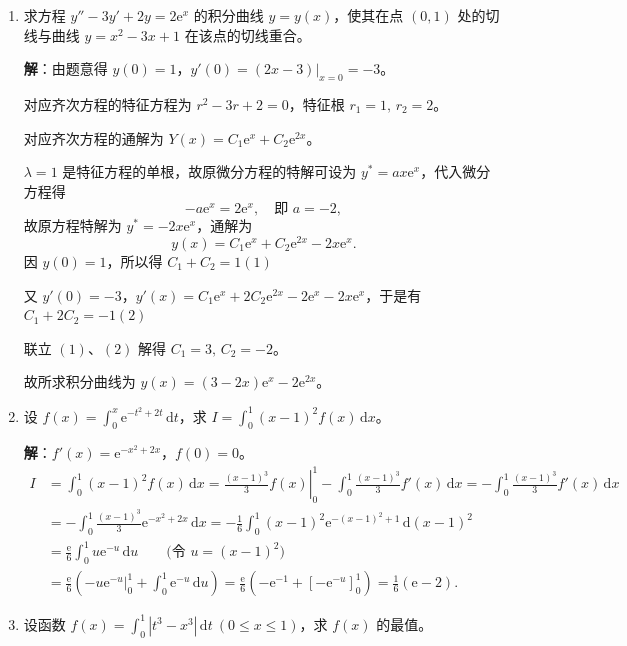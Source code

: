 \documentclass[a4paper,11pt]{ctexart}
\newcommand{\dd}{\,\mathrm{d}}
\newcommand{\e}{\mathrm{e}}
\begin{document}
\begin{enumerate}[label=\arabic*., start=11, leftmargin=2em, itemsep=0.9em, topsep=0.45em]
  \textbf{解}：将 $x=0$ 代入方程得 $\dfrac{1}{\sqrt{3}}\displaystyle\int_1^y\sqrt{4-t^2}\dd t=0$，因此得 $y=1$。

  方程两边关于 $x$ 求导得
  \[
    \e^{xy}(y+xy')+\frac{1}{\sqrt{3}}y'\sqrt{4-y^2}=0 \tag*{$(*)$}
  \]
  将 $x=0,\,y=1$ 代入方程 $(*)$ 得 $y'(0)=-1$，即 $\left.\dfrac{\dd y}{\dd x}\right|_{x=0}=-1$。

  \item 求方程 $y''-3y'+2y=2\e^x$ 的积分曲线 $y=y(x)$，使其在点 $(0,1)$ 处的切线与曲线 $y=x^2-3x+1$ 在该点的切线重合。

  \textbf{解}：由题意得 $y(0)=1$，$y'(0)=\left.(2x-3)\right|_{x=0}=-3$。

  对应齐次方程的特征方程为 $r^2-3r+2=0$，特征根 $r_1=1,\,r_2=2$。

  对应齐次方程的通解为 $Y(x)=C_1\e^x+C_2\e^{2x}$。

  $\lambda=1$ 是特征方程的单根，故原微分方程的特解可设为 $y^*=ax\e^x$，代入微分方程得
  \[
    -a\e^x=2\e^x,\quad\text{即 }a=-2,
  \]
  故原方程特解为 $y^*=-2x\e^x$，通解为
  \[
    y(x)=C_1\e^x+C_2\e^{2x}-2x\e^x.
  \]
  因 $y(0)=1$，所以得 $C_1+C_2=1$\quad $(1)$

  又 $y'(0)=-3$，$y'(x)=C_1\e^x+2C_2\e^{2x}-2\e^x-2x\e^x$，于是有 $C_1+2C_2=-1$\quad $(2)$

  联立 $(1)$、$(2)$ 解得 $C_1=3,\,C_2=-2$。

  故所求积分曲线为 $y(x)=(3-2x)\e^x-2\e^{2x}$。

  \item 设 $f(x)=\displaystyle\int_0^x\e^{-t^2+2t}\dd t$，求 $I=\displaystyle\int_0^1(x-1)^2 f(x)\dd x$。

  \textbf{解}：$f'(x)=\e^{-x^2+2x}$，$f(0)=0$。
  \begin{align*}
    I &= \int_0^1(x-1)^2 f(x)\dd x
       = \left.\frac{(x-1)^3}{3}f(x)\right|_0^1 - \int_0^1\frac{(x-1)^3}{3}f'(x)\dd x
       = -\int_0^1\frac{(x-1)^3}{3}f'(x)\dd x \\
      &= -\int_0^1\frac{(x-1)^3}{3}\e^{-x^2+2x}\dd x
       = -\frac{1}{6}\int_0^1(x-1)^2\e^{-(x-1)^2+1}\dd(x-1)^2 \\
      &= \frac{\e}{6}\int_0^1 u\e^{-u}\dd u \qquad\bigl(\text{令 }u=(x-1)^2\bigr) \\
      &= \frac{\e}{6}\left(\left.-u\e^{-u}\right|_0^1 + \int_0^1\e^{-u}\dd u\right)
       = \frac{\e}{6}\left(-\e^{-1}+\left[-\e^{-u}\right]_0^1\right)
       = \frac{1}{6}(\e-2).
  \end{align*}

  \item 设函数 $f(x)=\displaystyle\int_0^1|t^3-x^3|\dd t\ (0\le x\le 1)$，求 $f(x)$ 的最值。


\end{enumerate}
\end{document}
